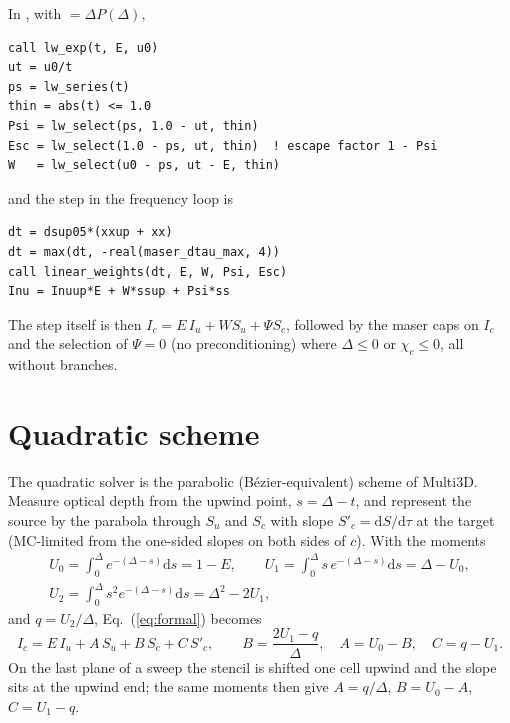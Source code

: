 \documentclass[paper=a4, fontsize=11pt]{scrartcl}
\numberwithin{equation}{section}
\numberwithin{table}{section}
\newcommand{\fort}[1]{\smash{\texttt{#1}}}
\begin{document}
In \fort{linear_weights}, with \fort{lw_series(t)} $=\Delta P(\Delta)$,
\begin{verbatim}
call lw_exp(t, E, u0)
ut = u0/t
ps = lw_series(t)
thin = abs(t) <= 1.0
Psi = lw_select(ps, 1.0 - ut, thin)
Esc = lw_select(1.0 - ps, ut, thin)  ! escape factor 1 - Psi
W   = lw_select(u0 - ps, ut - E, thin)
\end{verbatim}
and the step in the frequency loop is
\begin{verbatim}
dt = dsup05*(xxup + xx)
dt = max(dt, -real(maser_dtau_max, 4))
call linear_weights(dt, E, W, Psi, Esc)
Inu = Inuup*E + W*ssup + Psi*ss
\end{verbatim}

The step itself is then $I_c = E\,I_u + W S_u + \Psi S_c$, followed by the maser
caps on $I_c$ and the selection of $\Psi=0$ (no preconditioning) where
$\Delta\le0$ or $\chi_c\le0$, all without branches.

\section{Quadratic scheme}

The quadratic solver is the parabolic (B\'ezier-equivalent) scheme of Multi3D.
Measure optical depth from the upwind point, $s=\Delta-t$, and represent the
source by the parabola through $S_u$ and $S_c$ with slope $S'_c=\mathrm{d}S/\mathrm{d}\tau$ at
the target (MC-limited from the one-sided slopes on both sides of $c$). With
the moments
\begin{equation}
\begin{gathered}
  U_0 = \int_0^\Delta e^{-(\Delta-s)}\mathrm{d}s = 1-E,\qquad
  U_1 = \int_0^\Delta s\,e^{-(\Delta-s)}\mathrm{d}s = \Delta-U_0,\\
  U_2 = \int_0^\Delta s^2 e^{-(\Delta-s)}\mathrm{d}s = \Delta^2-2U_1,
\end{gathered}
\end{equation}
and $q=U_2/\Delta$, Eq.~(\ref{eq:formal}) becomes
\begin{equation}
  I_c = E\,I_u + A\,S_u + B\,S_c + C\,S'_c,\qquad
  B = \frac{2U_1-q}{\Delta},\quad A = U_0-B,\quad C = q-U_1 .
\end{equation}
On the last plane of a sweep the stencil is shifted one cell upwind and the
slope sits at the upwind end; the same moments then give
$A=q/\Delta$, $B=U_0-A$, $C=U_1-q$.
\end{document}
